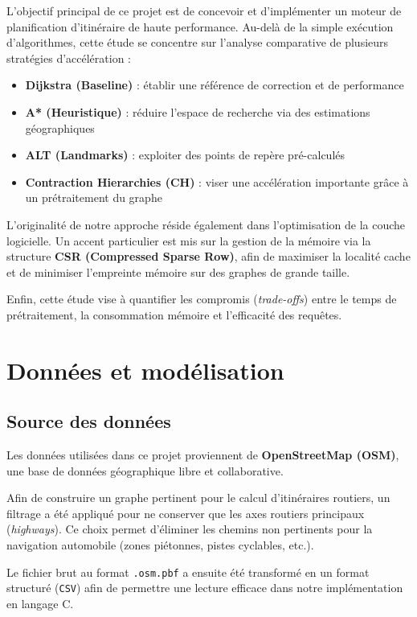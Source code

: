 \documentclass[11pt]{article}
\begin{document}
L'objectif principal de ce projet est de concevoir et d'implémenter un moteur de planification d'itinéraire de haute performance. Au-delà de la simple exécution d'algorithmes, cette étude se concentre sur l'analyse comparative de plusieurs stratégies d'accélération :

\begin{itemize}
\item \textbf{Dijkstra (Baseline)} : établir une référence de correction et de performance
\item \textbf{A* (Heuristique)} : réduire l'espace de recherche via des estimations géographiques
\item \textbf{ALT (Landmarks)} : exploiter des points de repère pré-calculés
\item \textbf{Contraction Hierarchies (CH)} : viser une accélération importante grâce à un prétraitement du graphe
\end{itemize}

L'originalité de notre approche réside également dans l'optimisation de la couche logicielle. Un accent particulier est mis sur la gestion de la mémoire via la structure \textbf{CSR (Compressed Sparse Row)}, afin de maximiser la localité cache et de minimiser l'empreinte mémoire sur des graphes de grande taille.

Enfin, cette étude vise à quantifier les compromis (\textit{trade-offs}) entre le temps de prétraitement, la consommation mémoire et l'efficacité des requêtes.

\section{Données et modélisation}

\subsection{Source des données}

Les données utilisées dans ce projet proviennent de \textbf{OpenStreetMap (OSM)}, une base de données géographique libre et collaborative.

Afin de construire un graphe pertinent pour le calcul d’itinéraires routiers, un filtrage a été appliqué pour ne conserver que les axes routiers principaux (\textit{highways}). Ce choix permet d’éliminer les chemins non pertinents pour la navigation automobile (zones piétonnes, pistes cyclables, etc.).

Le fichier brut au format \texttt{.osm.pbf} a ensuite été transformé en un format structuré (\texttt{CSV}) afin de permettre une lecture efficace dans notre implémentation en langage C.
\end{document}

